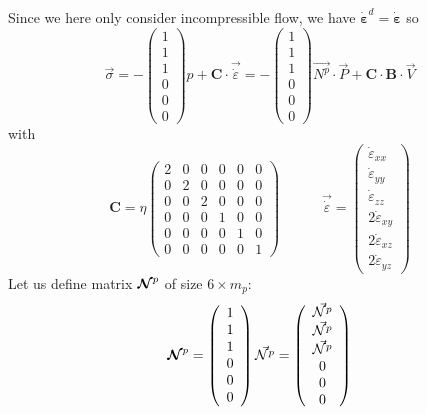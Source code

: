 Since we here only consider incompressible flow, we have $\dot{\bm \varepsilon}^d=\dot{\bm \varepsilon}$
so
\begin{equation}
\vec{\sigma} 
=-\left( 
\begin{array}{c}
1 \\ 1 \\ 1 \\ 0 \\ 0 \\ 0
\end{array}
\right) p+ {\bm C} \cdot \vec{\dot\varepsilon}
=
- \left(
\begin{array}{c}
1 \\ 1 \\ 1 \\ 0 \\ 0 \\ 0
\end{array}
\right)
\vec{N^p} \cdot {\vec P}  + 
{\bm C} \cdot  {\bm B}\cdot {\vec V}
\end{equation}
with
\begin{equation}
{\bm C}=
\eta
\left(
\begin{array}{cccccc}
2 & 0 & 0 & 0 & 0 & 0\\
0 & 2 & 0 & 0 & 0 & 0\\
0 & 0 & 2 & 0 & 0 & 0\\ 
0 & 0 & 0 & 1 & 0 & 0\\ 
0 & 0 & 0 & 0 & 1 & 0\\ 
0 & 0 & 0 & 0 & 0 & 1
\end{array}
\right)
\quad\quad\quad
\vec{\dot \varepsilon} = 
\left(
\begin{array}{c}
\dot \varepsilon_{xx} \\
\dot \varepsilon_{yy} \\
\dot \varepsilon_{zz} \\
2\dot \varepsilon_{xy}\\ 
2\dot \varepsilon_{xz} \\
2\dot \varepsilon_{yz} 
\end{array}
\right)  \label{eq:mixedC}
\end{equation}
Let us define matrix ${\bm {{\mathcal{N}}}}^p$ of size $6\times m_p$:
\begin{equation}
{\bm {{\mathcal{N}}}}^p=
\left(
\begin{array}{c}
1 \\ 1 \\ 1 \\ 0 \\ 0 \\ 0
\end{array}
\right)
\vec{{\mathcal{N}}^p} 
=
\left(
\begin{array}{c}
\vec{{\mathcal{N}}^p} \\
\vec{{\mathcal{N}}^p} \\
\vec{{\mathcal{N}}^p} \\
0 \\
0 \\
0
\end{array}
\right)
\end{equation}
